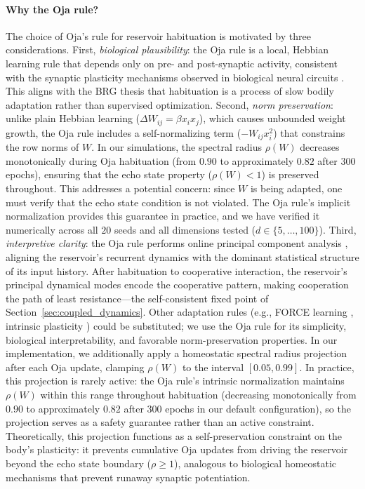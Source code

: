 \documentclass[11pt,a4paper]{article}
\theoremstyle{definition}
\newcommand{\Wres}{W}
\begin{document}
\paragraph{Why the Oja rule?}
The choice of Oja's rule \citep{oja1982} for reservoir habituation is
motivated by three considerations.
First, \emph{biological plausibility}: the Oja rule is a local,
Hebbian learning rule that depends only on pre- and post-synaptic
activity, consistent with the synaptic plasticity mechanisms observed
in biological neural circuits \citep{hebb1949}.  This aligns with the
BRG thesis that habituation is a process of slow bodily adaptation
rather than supervised optimization.
Second, \emph{norm preservation}: unlike plain Hebbian learning
($\Delta W_{ij} = \beta x_i x_j$), which causes unbounded weight growth,
the Oja rule includes a self-normalizing term
($-W_{ij} x_i^2$) that constrains the row norms of $\Wres$.  In our
simulations, the spectral radius $\rho(\Wres)$ decreases monotonically
during Oja habituation (from $0.90$ to approximately $0.82$ after $300$
epochs), ensuring that the echo state property
($\rho(\Wres) < 1$) is preserved throughout.
This addresses a potential concern: since $\Wres$ is being adapted,
one must verify that the echo state condition is not violated.
The Oja rule's implicit normalization provides this guarantee in practice,
and we have verified it numerically across all $20$ seeds and all
dimensions tested ($d \in \{5, \ldots, 100\}$).
Third, \emph{interpretive clarity}: the Oja rule performs online
principal component analysis \citep{oja1982}, aligning the reservoir's
recurrent dynamics with the dominant statistical structure of its
input history.  After habituation to cooperative interaction, the
reservoir's principal dynamical modes encode the cooperative pattern,
making cooperation the path of least resistance---the self-consistent
fixed point of Section~\ref{sec:coupled_dynamics}.
Other adaptation rules (e.g., FORCE learning \citep{sussillo2009},
intrinsic plasticity \citep{schrauwen2008}) could be substituted;
we use the Oja rule for its simplicity, biological interpretability,
and favorable norm-preservation properties.
In our implementation, we additionally apply a homeostatic spectral
radius projection after each Oja update, clamping
$\rho(\Wres)$ to the interval $[0.05, 0.99]$.
In practice, this projection is rarely active: the Oja rule's
intrinsic normalization maintains $\rho(\Wres)$ within this range
throughout habituation (decreasing monotonically from $0.90$ to
approximately $0.82$ after $300$ epochs in our default configuration),
so the projection serves as a safety guarantee rather than an
active constraint.  Theoretically, this projection functions as a
self-preservation constraint on the body's plasticity: it prevents
cumulative Oja updates from driving the reservoir beyond the echo
state boundary ($\rho \geq 1$), analogous to biological homeostatic
mechanisms that prevent runaway synaptic potentiation.
\end{document}
